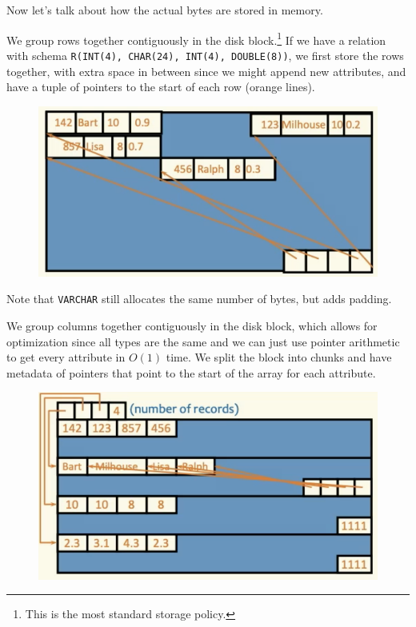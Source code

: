   Now let's talk about how the actual bytes are stored in memory. 

  \begin{definition}
    We group rows together contiguously in the disk block.\footnote{This is the most standard storage policy.} If we have a relation with schema \texttt{R(INT(4), CHAR(24), INT(4), DOUBLE(8))}, we first store the rows together, with extra space in between since we might append new attributes, and have a tuple of pointers to the start of each row (orange lines). 

    \begin{figure}[H]
      \centering 
      \includegraphics[scale=0.6]{img/row_major.png}
      \caption{} 
      \label{fig:row_major.png}
    \end{figure}
  \end{definition}

  Note that \texttt{VARCHAR} still allocates the same number of bytes, but adds padding. 

  \begin{definition}
    We group columns together contiguously in the disk block, which allows for optimization since all types are the same and we can just use pointer arithmetic to get every attribute in $O(1)$ time. We split the block into chunks and have metadata of pointers that point to the start of the array for each attribute. 

    \begin{figure}[H]
      \centering 
      \includegraphics[scale=0.6]{img/column_major.png}
      \caption{} 
      \label{fig:column_major}
    \end{figure}
  \end{definition}

